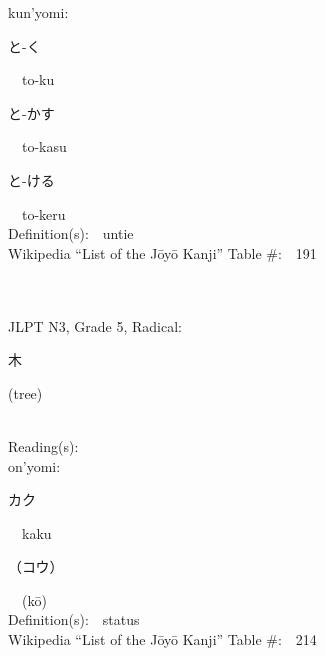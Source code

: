 \begin{multicols}{2}
{\hspace*{1em}}kun'yomi:\ \ \\
{\hspace*{2em}}{\begin{CJK}{UTF8}{min} と-く \end{CJK}}\ \ to-ku\ \ \\
{\hspace*{2em}}{\begin{CJK}{UTF8}{min} と-かす \end{CJK}}\ \ to-kasu\ \ \\
{\hspace*{2em}}{\begin{CJK}{UTF8}{min} と-ける \end{CJK}}\ \ to-keru\ \ \\
Definition(s):\ \ untie \\
Wikipedia ``List of the J\=oy\=o Kanji'' Table \#:\ \ 191 \\
\ \ \\
{\fontsize{34pt}{40pt}  }\ \ \\  %
{JLPT N3, Grade 5, Radical:\ \ {\begin{CJK}{UTF8}{min} 木 \end{CJK}} (tree) } \\
Reading(s):\ \ \\
{\hspace*{1em}}on'yomi:\ \ \\
{\hspace*{2em}}{\begin{CJK}{UTF8}{min} カク \end{CJK}}\ \ kaku\ \ \\
{\hspace*{2em}}{\begin{CJK}{UTF8}{min} （コウ） \end{CJK}}\ \ (k\=o)\ \ \\
Definition(s):\ \ status \\
Wikipedia ``List of the J\=oy\=o Kanji'' Table \#:\ \ 214 \\
\ \ \\
{\fontsize{34pt}{40pt}  }\ \ \\  %

\end{multicols}
